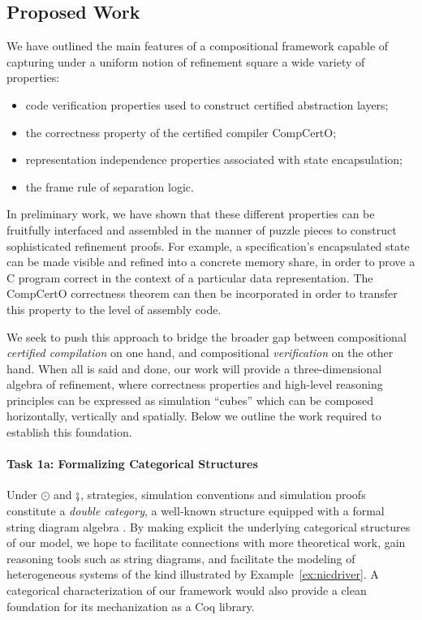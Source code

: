 
\subsection{Proposed Work}

We have outlined the main features of a compositional framework
capable of capturing under a uniform notion of refinement square
a wide variety of properties:
\begin{itemize}
  \item code verification properties used to construct certified abstraction layers;
  \item the correctness property of the certified compiler CompCertO;
  \item representation independence properties associated with state encapsulation;
  \item the frame rule of separation logic.
\end{itemize}
In preliminary work,
we have shown that these different properties
can be fruitfully interfaced and assembled in the manner of puzzle pieces
to construct sophisticated refinement proofs.
For example,
a specification's encapsulated state
can be made visible and refined into a concrete memory share,
in order to prove a C program correct in the context of a particular data representation.
The CompCertO correctness theorem can then be incorporated
in order to transfer this property to the level of assembly code.

We seek to push this approach
to bridge the broader gap between
compositional \emph{certified compilation} on one hand, and
compositional \emph{verification} on the other hand.
When all is said and done,
our work will provide a three-dimensional algebra of refinement,
where correctness properties and high-level reasoning principles
can be expressed as simulation ``cubes''
which can be composed horizontally, vertically and spatially.
Below we outline the work required to establish this foundation.

\vspace*{-2ex}
\paragraph*{Task 1a: Formalizing Categorical Structures}

Under $\odot$ and $\fatsemi$,
strategies, simulation conventions and simulation proofs
constitute a \emph{double category},
a well-known structure equipped with a formal string diagram algebra
\cite{dcsd}.
By making explicit the underlying categorical structures
of our model,
we hope to facilitate connections with more theoretical work,
gain reasoning tools such as string diagrams,
and facilitate the modeling of heterogeneous systems
of the kind illustrated by Example~\ref{ex:nicdriver}.
A categorical characterization of our framework
would also provide a clean foundation for its mechanization
as a Coq library.

